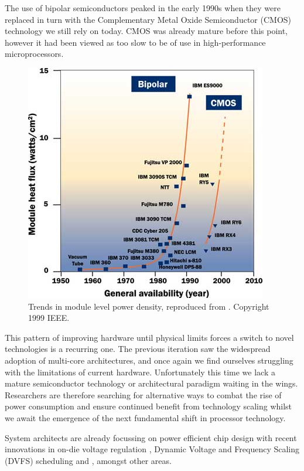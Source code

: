 The use of bipolar semiconductors peaked in the early 1990s when they were replaced in turn with the Complementary Metal Oxide Semiconductor (CMOS) technology we still rely on today. CMOS was already mature before this point, however it had been viewed as too slow to be of use in high-performance microprocessors. \golden
\begin{figure}[ht]
\centering
\includegraphics[width=0.9\linewidth]{Images/bipolarcmos.jpg}
\caption{Trends in module level power density, reproduced from \cite{chu:1999aa}. Copyright 1999 IEEE.}
\end{figure}
This pattern of improving hardware until physical limits forces a switch to novel technologies is a recurring one. The previous iteration saw the widespread adoption of multi-core architectures, and once again we find ourselves struggling with the limitations of current hardware. Unfortunately this time we lack a mature semiconductor technology or architectural paradigm waiting in the wings. Researchers are therefore searching for alternative ways to combat the rise of power consumption and ensure continued benefit from technology scaling whilst we await the emergence of the next fundamental shift in processor technology. \golden

System architects are already focussing on power efficient chip design with recent innovations in on-die voltage regulation \cite{burton:2014aa}, Dynamic Voltage and Frequency Scaling (DVFS) scheduling \cite{kwon:2013aa} and , amongst other areas.

